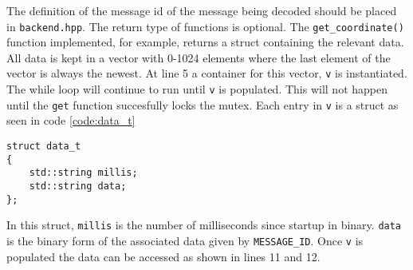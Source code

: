 The definition of the message id of the message being decoded should be placed in \texttt{backend.hpp}.
The return type of functions is optional.
The \texttt{get\_coordinate()} function implemented, for example, returns a struct containing the relevant data.
All data is kept in a vector with 0-1024 elements where the last element of the vector is always the newest.
At line 5 a container for this vector, \texttt{v} is instantiated.
The while loop will continue to run until \texttt{v} is populated.
This will not happen until the \texttt{get} function succesfully locks the mutex.
Each entry in \texttt{v} is a struct as seen in code \ref{code:data_t}

\begin{lstlisting}[caption=Struct used to store each datapoint,label=code:data_t]
struct data_t
{
	std::string millis;
	std::string data;
};
\end{lstlisting}

In this struct, \texttt{millis} is the number of milliseconds since startup in binary.
\texttt{data} is the binary form of the associated data given by \texttt{MESSAGE\_ID}.
Once \texttt{v} is populated the data can be accessed as shown in lines 11 and 12.